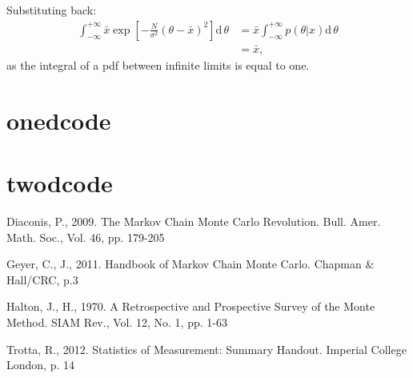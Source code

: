 \documentclass[a4paper,11pt,twoside]{article}
\begin{document}
Substituting back:
\begin{align*}
	\int_{-\infty}^{+\infty} \bar{x} \exp \left[- \frac{N}{\sigma^2} (\theta - \bar{x})^2 \right] \mathrm{d} \, \theta &= \bar{x} \int_{-\infty}^{+\infty} p(\theta|x) \mathrm{d} \, \theta
	\\ &= \bar{x},
\end{align*}
as the integral of a pdf between infinite limits is equal to one. 
\section{onedcode} 
\label{sec:onedcode}

\section{twodcode}
\label{sec:twodcode}

\begin{thebibliography}{10}

		Diaconis, P., 2009. The Markov Chain Monte Carlo Revolution.
		Bull. Amer. Math. Soc., Vol. 46, pp. 179-205

		Geyer, C., J., 2011. Handbook of Markov Chain Monte Carlo.
		Chapman \& Hall/CRC, p.3
		
		Halton, J., H., 1970. A Retrospective and Prospective Survey of
		the Monte Method. SIAM Rev., Vol. 12, No. 1, pp. 1-63
	
		Trotta, R., 2012. Statistics of Measurement: Summary Handout.
		Imperial College London, p. 14

\end{thebibliography}
\end{document}
